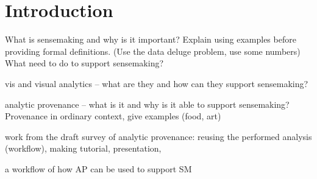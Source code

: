 \chapter{Introduction}

\graphicspath{{Chapter1/figures/}}

What is sensemaking and why is it important? Explain using examples before providing formal definitions. (Use the data deluge problem, use some numbers) What need to do to support sensemaking?

vis and visual analytics -- what are they and how can they support sensemaking?

analytic provenance -- what is it and why is it able to support sensemaking?
Provenance in ordinary context, give examples (food, art)

work from the draft survey of analytic provenance: reusing the performed analysis (workflow), making tutorial, presentation,



a workflow of how AP can be used to support SM

